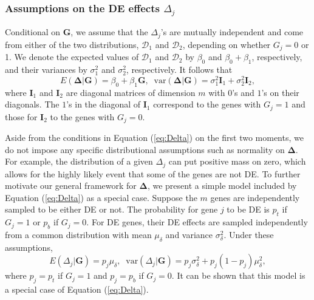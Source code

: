 \documentclass[useAMS,usenatbib, galley]{biom}
\begin{document}
	\subsubsection{Assumptions on the DE effects $\Delta_j$}\label{subsection:DeltaModel}
	Conditional on $\bm G$, we assume that the $\Delta_j$'s are mutually independent and come from either of the two distributions, $\mathscr{D}_1$ and $\mathscr{D}_2$, depending on whether $G_j=0$ or 1. We denote the expected values of $\mathscr{D}_1$ and $\mathscr{D}_2$ by $\beta_0$ and $\beta_0+\beta_1$, respectively, and their variances by $\sigma_1^2$ and $\sigma_2^2$, respectively. It follows that 
	\begin{equation}
		\label{eq:Delta}
		E(\bm \Delta|\bm G)=\beta_0 + \beta_1 \bm G,\;\; \mbox{var}(\bm \Delta|\bm G) = \sigma_1^2\bm I_1+\sigma_2^2\bm I_2,
	\end{equation} 
	where $\bm I_1$ and $\bm I_2$ are diagonal matrices of dimension $m$ with $0$'s and $1$'s on their diagonals. The $1$'s in the diagonal of $\bm I_1$ correspond to the genes with $G_j=1$ and those for $\bm I_2$ to the genes with $G_j=0$.
	
	Aside from the conditions in Equation (\ref{eq:Delta}) on the first two moments, we do not impose any specific distributional assumptions such as normality on $\bm \Delta$. For example, the distribution of a given $\Delta_j$ can put positive mass on zero, which allows for the highly likely event that some of the genes are not DE. To further motivate our general framework for $\bm \Delta$, we present a simple model included by Equation (\ref{eq:Delta}) as a special case. Suppose the $m$ genes are independently sampled to be either DE or not. The probability for gene $j$ to be DE is $p_t$ if $G_j=1$ or $p_b$ if $G_j=0$. For DE genes, their DE effects are sampled independently from a common distribution with mean $\mu_\delta$ and variance $\sigma^2_\delta$. Under these assumptions, 
	\begin{equation}
		\label{eq:DeltaBinom}
		E(\Delta_j|\bm G) = p_j\mu_{\delta},\;\; \mbox{var}(\Delta_j|\bm G)= p_j\sigma_{\delta}^2 + p_j(1-p_j)\mu_{\delta}^2,
	\end{equation}
	where $p_j=p_{t}$ if $G_j=1$ and $p_j=p_{b}$ if $G_j=0$. It can be shown that this model is a special case of Equation (\ref{eq:Delta}).
	
\end{document}
